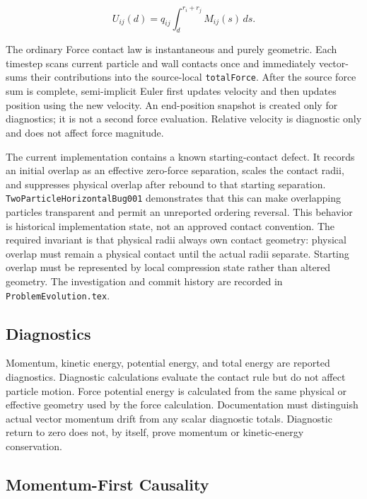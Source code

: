 \begin{equation}
U_{ij}(d)=q_{ij}\int_d^{r_i+r_j}M_{ij}(s)\,ds.
\end{equation}

The ordinary Force contact law is instantaneous and purely geometric.  Each
timestep scans current particle and wall contacts once and immediately
vector-sums their contributions into the source-local \texttt{totalForce}.
After the source force sum is complete, semi-implicit Euler first updates
velocity and then updates position using the new velocity.  An end-position
snapshot is created only for diagnostics; it is not a second force evaluation.
Relative velocity is diagnostic only and does not affect force magnitude.

The current implementation contains a known starting-contact defect.  It
records an initial overlap as an effective zero-force separation, scales the
contact radii, and suppresses physical overlap after rebound to that starting
separation.  \texttt{TwoParticleHorizontalBug001} demonstrates that this can
make overlapping particles transparent and permit an unreported ordering
reversal.  This behavior is historical implementation state, not an approved
contact convention.  The required invariant is that physical radii always own
contact geometry: physical overlap must remain a physical contact until the
actual radii separate.  Starting overlap must be represented by local
compression state rather than altered geometry.  The investigation and commit
history are recorded in \texttt{ProblemEvolution.tex}.

\subsection{Diagnostics}

Momentum, kinetic energy, potential energy, and total energy are reported
diagnostics.  Diagnostic calculations evaluate the contact rule but do not
affect particle motion.  Force potential energy is calculated from the same
physical or effective geometry used by the force calculation.  Documentation
must distinguish actual vector momentum drift from any scalar diagnostic
totals.  Diagnostic return to zero does not, by itself, prove momentum or
kinetic-energy conservation.

\subsection{Momentum-First Causality}

